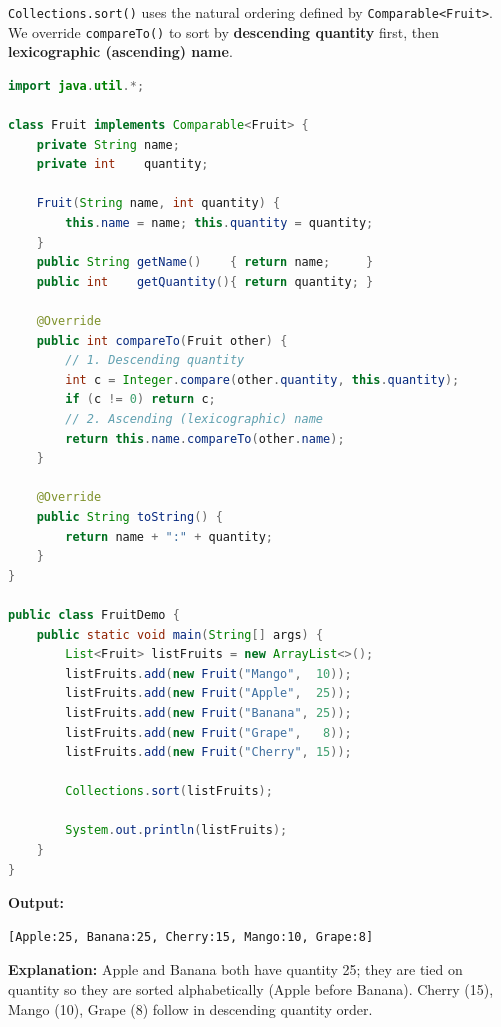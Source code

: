 \documentclass[12pt,a3paper]{article}
\begin{document}
\begin{enumerate}
\begin{tcolorbox}[enhanced,breakable,ansbox,
  colback=cH!4,colframe=cH,boxrule=0.8pt,arc=5pt,
  title={\textbf{Answer — Fruit: Descending Quantity,
  Then Lexicographic Name}},
  fonttitle=\bfseries\color{white},colbacktitle=cH]

\texttt{Collections.sort()} uses the natural ordering
defined by \texttt{Comparable<Fruit>}. We override
\texttt{compareTo()} to sort by
\textbf{descending quantity} first, then
\textbf{lexicographic (ascending) name}.

\begin{lstlisting}[language=Java]
import java.util.*;

class Fruit implements Comparable<Fruit> {
    private String name;
    private int    quantity;

    Fruit(String name, int quantity) {
        this.name = name; this.quantity = quantity;
    }
    public String getName()    { return name;     }
    public int    getQuantity(){ return quantity; }

    @Override
    public int compareTo(Fruit other) {
        // 1. Descending quantity
        int c = Integer.compare(other.quantity, this.quantity);
        if (c != 0) return c;
        // 2. Ascending (lexicographic) name
        return this.name.compareTo(other.name);
    }

    @Override
    public String toString() {
        return name + ":" + quantity;
    }
}

public class FruitDemo {
    public static void main(String[] args) {
        List<Fruit> listFruits = new ArrayList<>();
        listFruits.add(new Fruit("Mango",  10));
        listFruits.add(new Fruit("Apple",  25));
        listFruits.add(new Fruit("Banana", 25));
        listFruits.add(new Fruit("Grape",   8));
        listFruits.add(new Fruit("Cherry", 15));

        Collections.sort(listFruits);

        System.out.println(listFruits);
    }
}
\end{lstlisting}

\textbf{Output:}
\begin{verbatim}
[Apple:25, Banana:25, Cherry:15, Mango:10, Grape:8]
\end{verbatim}

\textbf{Explanation:}
Apple and Banana both have quantity 25; they are
tied on quantity so they are sorted alphabetically
(Apple before Banana). Cherry (15), Mango (10),
Grape (8) follow in descending quantity order.


\end{tcolorbox}
\end{enumerate}
\end{document}
